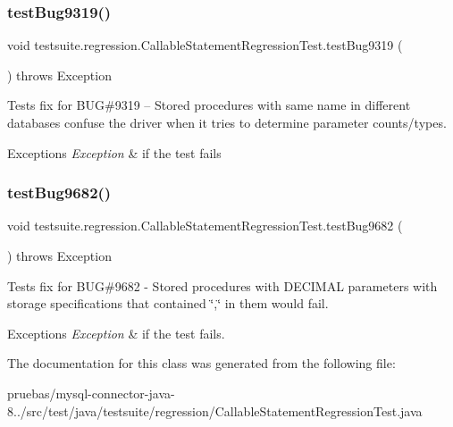 \subsubsection{\texorpdfstring{test\+Bug9319()}{testBug9319()}}
{\footnotesize\ttfamily void testsuite.\+regression.\+Callable\+Statement\+Regression\+Test.\+test\+Bug9319 (\begin{DoxyParamCaption}{ }\end{DoxyParamCaption}) throws Exception}

Tests fix for B\+UG\#9319 -- Stored procedures with same name in different databases confuse the driver when it tries to determine parameter counts/types.


\begin{DoxyExceptions}{Exceptions}
{\em Exception} & if the test fails \\
\hline
\end{DoxyExceptions}
\mbox{\label{classtestsuite_1_1regression_1_1_callable_statement_regression_test_aa84b6f7f456f3d576c6d8c22213a24b2}} 
\subsubsection{\texorpdfstring{test\+Bug9682()}{testBug9682()}}
{\footnotesize\ttfamily void testsuite.\+regression.\+Callable\+Statement\+Regression\+Test.\+test\+Bug9682 (\begin{DoxyParamCaption}{ }\end{DoxyParamCaption}) throws Exception}

Tests fix for B\+UG\#9682 -\/ Stored procedures with D\+E\+C\+I\+M\+AL parameters with storage specifications that contained \char`\"{},\char`\"{} in them would fail.


\begin{DoxyExceptions}{Exceptions}
{\em Exception} & if the test fails. \\
\hline
\end{DoxyExceptions}


The documentation for this class was generated from the following file\+:\begin{DoxyCompactItemize}
\item 
pruebas/mysql-\/connector-\/java-\/8../src/test/java/testsuite/regression/Callable\+Statement\+Regression\+Test.\+java\end{DoxyCompactItemize}
